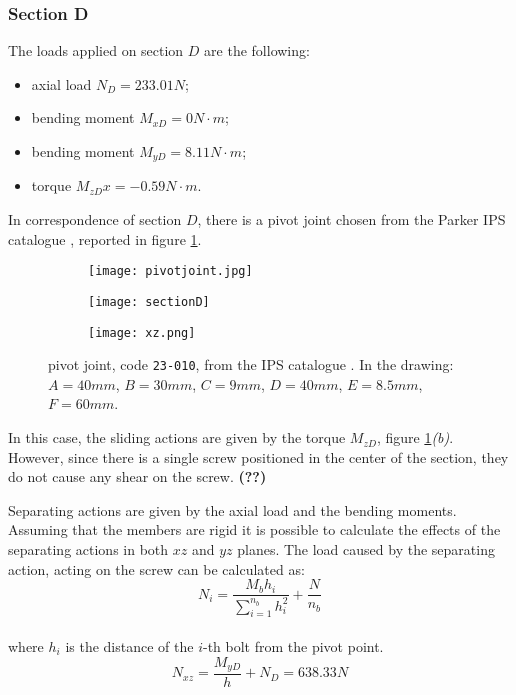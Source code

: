 \subsubsection*{Section D}
The loads applied on section $D$ are the following:
\begin{itemize}
	\item axial load $N_{D} = 233.01 N$;
	\item bending moment $M_{xD} = 0 N\cdot m$; 
	\item bending moment $M_{yD} = 8.11 N\cdot m$; 
	\item torque $M_{zD}x = -0.59 N\cdot m$.
\end{itemize}
In correspondence of section $D$, there is a pivot joint chosen from the Parker IPS catalogue \cite{parker-ds}, reported in figure \ref{fig:pivot}.
\begin{figure}[h!]
    \centering
    \begin{subfigure}{0.32\linewidth}
    	\centering \texttt{[image: pivotjoint.jpg]} \caption{}
    \end{subfigure}
	\begin{subfigure}{0.32\linewidth}
		\centering \texttt{[image: sectionD]} \caption{}
	\end{subfigure}
	\begin{subfigure}{0.32\linewidth}
		\centering \texttt{[image: xz.png]} \caption{}
	\end{subfigure}    
    \caption{pivot joint, code \texttt{23-010}, from the IPS catalogue \cite{parker-ds}. In the drawing: $A = 40mm$, $B=30mm$, $C=9mm$, $D=40mm$, $E=8.5mm$, $F=60mm$.}
    \label{fig:pivot}
\end{figure}

In this case, the sliding actions are given by the torque $M_{zD}$,  figure \ref{fig:pivot}\textit{(b)}. However, since there is a single screw positioned in the center of the section, they do not cause any shear on the screw. \textbf{(??)}

Separating actions are given by the axial load and the bending moments. Assuming that the members are rigid it is possible to calculate the effects of the separating actions in both $xz$ and $yz$ planes. The load caused by the separating action, acting on the screw can be calculated as:
\begin{equation*}
    N_{i} = \frac{M_{b}h_{i}}{\sum\limits_{i=1}^{n_{b}} h^2_{i}} + \frac{N}{n_{b}}
\end{equation*}\\
where $h_{i}$ is the distance of the $i$-th bolt from the pivot point.
\begin{equation*}
    N_{xz} = \frac{M_{yD}}{h} + N_{D} = 638.33 N
\end{equation*}

